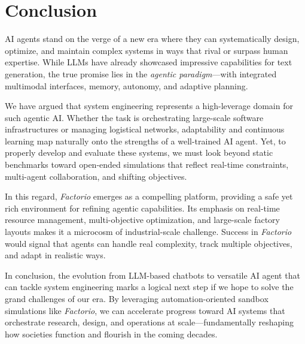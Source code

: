 \section{Conclusion}
AI agents stand on the verge of a new era where they can systematically design, optimize, and maintain complex systems in ways that rival or surpass human expertise. While LLMs have already showcased impressive capabilities for text generation, the true promise lies in the \textit{agentic paradigm}—with integrated multimodal interfaces, memory, autonomy, and adaptive planning.

We have argued that system engineering represents a high-leverage domain for such agentic AI. Whether the task is orchestrating large-scale software infrastructures or managing logistical networks, adaptability and continuous learning map naturally onto the strengths of a well-trained AI agent. Yet, to properly develop and evaluate these systems, we must look beyond static benchmarks toward open-ended simulations that reflect real-time constraints, multi-agent collaboration, and shifting objectives.

In this regard, \textit{Factorio} emerges as a compelling platform, providing a safe yet rich environment for refining agentic capabilities. Its emphasis on real-time resource management, multi-objective optimization, and large-scale factory layouts makes it a microcosm of industrial-scale challenge. Success in \textit{Factorio} would signal that agents can handle real complexity, track multiple objectives, and adapt in realistic ways.

In conclusion, the evolution from LLM-based chatbots to versatile AI agent that can tackle system engineering marks a logical next step if we hope to solve the grand challenges of our era. By leveraging automation-oriented sandbox simulations like \textit{Factorio}, we can accelerate progress toward AI systems that orchestrate research, design, and operations at scale—fundamentally reshaping how societies function and flourish in the coming decades.
